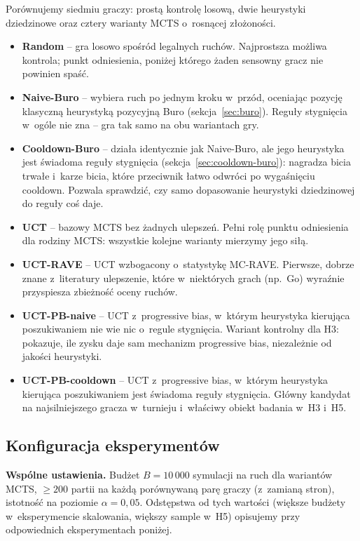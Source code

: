 \documentclass[11pt,a4paper]{article}
\begin{document}
Porównujemy siedmiu graczy: prostą kontrolę losową, dwie heurystyki dziedzinowe oraz cztery warianty MCTS o~rosnącej złożoności.
\begin{itemize}[leftmargin=1.5em,itemsep=2pt]
    \item \textbf{Random} -- gra losowo spośród legalnych ruchów. Najprostsza możliwa kontrola; punkt odniesienia, poniżej którego żaden sensowny gracz nie powinien spaść.
    \item \textbf{Naive-Buro} -- wybiera ruch po jednym kroku w~przód, oceniając pozycję klasyczną heurystyką pozycyjną Buro (sekcja~\ref{sec:buro}). Reguły stygnięcia w~ogóle nie zna -- gra tak samo na obu wariantach gry.
    \item \textbf{Cooldown-Buro} -- działa identycznie jak Naive-Buro, ale jego heurystyka jest świadoma reguły stygnięcia (sekcja~\ref{sec:cooldown-buro}): nagradza bicia trwałe i~karze bicia, które przeciwnik łatwo odwróci po wygaśnięciu cooldown. Pozwala sprawdzić, czy samo dopasowanie heurystyki dziedzinowej do reguły coś daje.
    \item \textbf{UCT} -- bazowy MCTS bez żadnych ulepszeń. Pełni rolę punktu odniesienia dla rodziny MCTS: wszystkie kolejne warianty mierzymy jego siłą.
    \item \textbf{UCT-RAVE} -- UCT wzbogacony o~statystykę MC-RAVE. Pierwsze, dobrze znane z~literatury ulepszenie, które w~niektórych grach (np.\ Go) wyraźnie przyspiesza zbieżność oceny ruchów.
    \item \textbf{UCT-PB-naive} -- UCT z~progressive bias, w~którym heurystyka kierująca poszukiwaniem nie wie nic o~regule stygnięcia. Wariant kontrolny dla H3: pokazuje, ile zysku daje sam mechanizm progressive bias, niezależnie od jakości heurystyki.
    \item \textbf{UCT-PB-cooldown} -- UCT z~progressive bias, w~którym heurystyka kierująca poszukiwaniem jest świadoma reguły stygnięcia. Główny kandydat na najsilniejszego gracza w~turnieju i~właściwy obiekt badania w~H3 i~H5.
\end{itemize}

\subsection{Konfiguracja eksperymentów}

\textbf{Wspólne ustawienia.} Budżet $B = 10\,000$ symulacji na ruch dla wariantów MCTS, $\geq 200$ partii na każdą porównywaną parę graczy (z~zamianą stron), istotność na poziomie $\alpha = 0{,}05$. Odstępstwa od tych wartości (większe budżety w~eksperymencie skalowania, większy sample w~H5) opisujemy przy odpowiednich eksperymentach poniżej.
\end{document}
